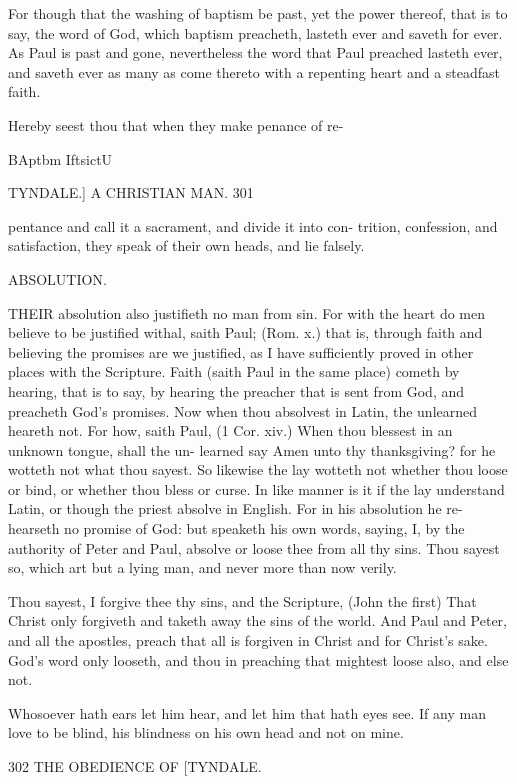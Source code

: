 \documentclass{custom}
\begin{document}
{For though that the washing of baptism be past, yet the 
power thereof, that is to say, the word of God, which 
baptism preacheth, lasteth ever and saveth for ever. As 
Paul is past and gone, nevertheless the word that Paul 
preached lasteth ever, and saveth ever as many as come 
thereto with a repenting heart and a steadfast faith. 

Hereby seest thou that when they make penance of re- 

BAptbm 
IftsictU 


TYNDALE.] A CHRISTIAN MAN. 301

pentance and call it a sacrament, and divide it into con- 
trition, confession, and satisfaction, they speak of their own 
heads, and lie falsely. 


ABSOLUTION. 

THEIR absolution also justifieth no man from sin. For 
with the heart do men believe to be justified withal, 
saith Paul; (Rom. x.) that is, through faith and believing 
the promises are we justified, as I have sufficiently proved 
in other places with the Scripture. Faith (saith Paul in 
the same place) cometh by hearing, that is to say, by 
hearing the preacher that is sent from God, and preacheth 
God's promises. Now when thou absolvest in Latin, the 
unlearned heareth not. For how, saith Paul, (1 Cor. xiv.) 
When thou blessest in an unknown tongue, shall the un- 
learned say Amen unto thy thanksgiving? for he wotteth not 
what thou sayest. So likewise the lay wotteth not whether 
thou loose or bind, or whether thou bless or curse. In 
like manner is it if the lay understand Latin, or though the 
priest absolve in English. For in his absolution he re- 
hearseth no promise of God: but speaketh his own words, 
saying, I, by the authority of Peter and Paul, absolve or 
loose thee from all thy sins. Thou sayest so, which art 
but a lying man, and never more than now verily. 

Thou sayest, I forgive thee thy sins, and the Scripture, 
(John the first) That Christ only forgiveth and taketh away 
the sins of the world. And Paul and Peter, and all the 
apostles, preach that all is forgiven in Christ and for Christ's 
sake. God's word only looseth, and thou in preaching 
that mightest loose also, and else not. 

Whosoever hath ears let him hear, and let him that hath 
eyes see. If any man love to be blind, his blindness on 
his own head and not on mine. 


302
THE OBEDIENCE OF
[TYNDALE.

}
\end{document}

